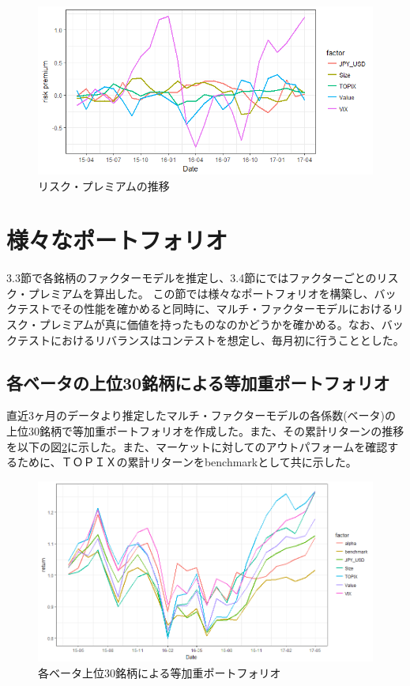 \documentclass[11pt]{jreport}
\begin{document}
\begin{figure}[H]
	\begin{center}
		\includegraphics[width=15cm]{./fig/riskpremium.png}
		\caption{リスク・プレミアムの推移}
		\label{fig:riskpremium}
	\end{center}
\end{figure}
\section{様々なポートフォリオ}
3.3節で各銘柄のファクターモデルを推定し、3.4節にではファクターごとのリスク・プレミアムを算出した。
この節では様々なポートフォリオを構築し、バックテストでその性能を確かめると同時に、マルチ・ファクターモデルにおけるリスク・プレミアムが真に価値を持ったものなのかどうかを確かめる。なお、バックテストにおけるリバランスはコンテストを想定し、毎月初に行うこととした。

\subsection{各ベータの上位30銘柄による等加重ポートフォリオ}
直近3ヶ月のデータより推定したマルチ・ファクターモデルの各係数(ベータ)の上位30銘柄で等加重ポートフォリオを作成した。また、その累計リターンの推移を以下の図\ref{fig:factor_top30}に示した。また、マーケットに対してのアウトパフォームを確認するために、ＴＯＰＩＸの累計リターンをbenchmarkとして共に示した。


\begin{figure}[H]
	\begin{center}
		\includegraphics[width=15cm]{./fig/factor_top30.png}
		\caption{各ベータ上位30銘柄による等加重ポートフォリオ}
		\label{fig:factor_top30}
	\end{center}
\end{figure}
\end{document}
